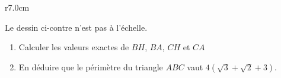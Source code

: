 
\begin{exercice}\label{exosmath-0445}

\begin{wrapfigure}{r}{7.0cm}
   \vspace{-3.0cm}        %
   \centering
   
\end{wrapfigure}

Le dessin ci-contre n'est pas à l'échelle.
\begin{enumerate}
    \item
Calculer les valeurs exactes de $BH$, $BA$, $CH$ et $CA$
\item
    En déduire que le périmètre du triangle \( ABC\) vaut \( 4(\sqrt{3}+\sqrt{2}+3)\).
\end{enumerate}

\end{exercice}
